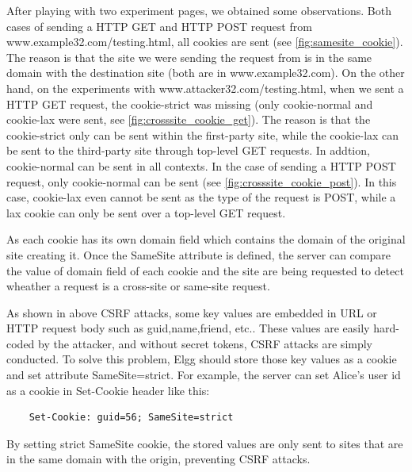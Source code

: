 After playing with two experiment pages, we obtained some observations.
Both cases of sending a HTTP GET and HTTP POST request from {
\selectfont www.example32.com/testing.html}, all cookies are sent (see \autoref{fig:samesite_cookie}).
The reason is that the site we were sending the request from is in the same domain
with the destination site (both are in {\selectfont www.example32.com}).
On the other hand, on the experiments with {\selectfont
www.attacker32.com/testing.html}, when we sent a HTTP GET request, the {\selectfont cookie-strict}
was missing (only {\selectfont cookie-normal} and {\selectfont cookie-lax}
were sent, see \autoref{fig:crosssite_cookie_get}).
The reason is that the {\selectfont cookie-strict} only can be sent within
the first-party site, while the {\selectfont cookie-lax} can be sent to
the third-party site  through top-level GET
requests. In addtion, {\selectfont cookie-normal} can be sent in all contexts.
In the case of sending a HTTP POST request, only {\selectfont cookie-normal}
can be sent (see \autoref{fig:crosssite_cookie_post}). In this case, {\selectfont
cookie-lax} even cannot be sent as the type of the request is POST, while a lax cookie can only
be sent over a top-level GET request.

As each cookie has its own {\selectfont domain} field which contains the domain
of the original site creating it. Once the SameSite attribute is defined, the server can compare
the value of {\selectfont domain} field of each cookie and the site are being
requested to detect wheather a request is a cross-site or same-site request.

As shown in above CSRF attacks, some key values are embedded in URL or HTTP request body
such as {\selectfont guid,name,friend, etc.}. These values
are easily hard-coded by the attacker, and without secret tokens, CSRF attacks
are simply conducted. To solve this problem, Elgg should store those key values
as a cookie and set attribute {\selectfont SameSite=strict}.
For example, the server can set Alice's user id as a cookie in {\selectfont
Set-Cookie} header like this:

\begin{verbatim}
    Set-Cookie: guid=56; SameSite=strict
\end{verbatim}

By setting strict SameSite cookie, the stored values are only sent to sites that are
in the same domain with the origin, preventing CSRF attacks.
